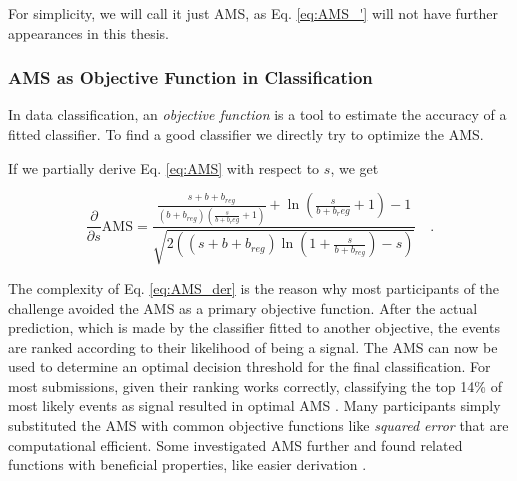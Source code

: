 For simplicity, we will call it just AMS, as Eq. \eqref{eq:AMS_'} will not have further appearances in this thesis.

\subsubsection{AMS as Objective Function in Classification}
In data classification, an \emph{objective function} is a tool to estimate the accuracy of a fitted classifier. To find a good classifier we directly try to optimize the AMS.

If we partially derive Eq. \eqref{eq:AMS} with respect to $s$, we get

\begin{equation}\label{eq:AMS_der}
	\frac{\partial}{\partial s} \mathrm{AMS} = 
	\frac{\frac{s + b + b_{reg}}
	{ ( b + b_{reg} ) \left( \frac{s}{b + b_reg} + 1 \right)}
	+ \ln \left( \frac{s}{b + b_reg} + 1 \right) - 1}
	{ \sqrt{2 \left( ( s + b + b_{reg} ) \ln{ \left( 1 +  \frac{s}{b+b_{reg}} \right)} - s \right)}} \mathrm{\hspace{1em}.}
\end{equation}

The complexity of Eq. \eqref{eq:AMS_der} is the reason why most participants of the challenge avoided the AMS as a primary objective function. After the actual prediction, which is made by the classifier fitted to another objective, the events are ranked according to their likelihood of being a signal. The AMS can now be used to determine an optimal decision threshold for the final classification. For most submissions, given their ranking works correctly, classifying the top 14\% of most likely events as signal resulted in optimal AMS \cite{cowa14}. Many participants simply substituted the AMS with common objective functions like \emph{squared error} that are computational efficient. Some investigated AMS further and found related functions with beneficial properties, like easier derivation \cite{kotl14,mack14,diaz14}.